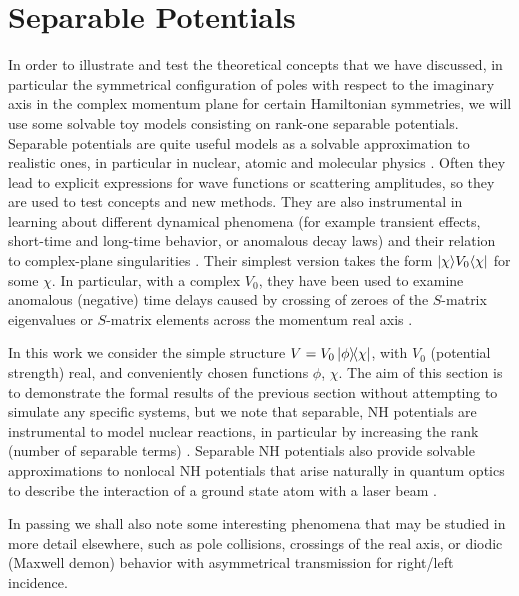 \section{Separable Potentials}
\label{sep_pot_sec}
%
%
In order to illustrate and test the theoretical concepts that we have discussed, in particular the
symmetrical configuration of poles with respect to the imaginary axis in the complex momentum plane for certain Hamiltonian symmetries, we will use some solvable toy models consisting on rank-one separable potentials.
Separable potentials are quite useful models as a solvable approximation to realistic ones, in particular in nuclear, atomic and molecular physics \cite{Popov2019}.
Often they lead to explicit expressions
for wave functions or scattering amplitudes, so they are used to test concepts and new methods.
They are also instrumental in learning about different dynamical phenomena (for example transient effects, short-time and long-time behavior, or anomalous decay laws)  and their relation to complex-plane singularities
\cite{Muga1990,Muga1996,Muga1996b,Muga1998a}. Their simplest version takes the form
$|\chi\rangle V_0\langle\chi|$ for some  $\chi$.   In particular, with a complex $V_0$,
they have been used to examine anomalous (negative) time delays caused by  crossing of zeroes of the $S$-matrix eigenvalues or $S$-matrix elements across the momentum real axis \cite{Muga1998b}.

In this work we consider the simple structure
$V=V_0 \ketbra{\phi}{\chi}$, with $V_0$ (potential strength) real, and conveniently chosen functions $\phi$, $\chi$.
The aim of this section is to demonstrate the formal results of the previous section without attempting to simulate any specific systems, but we note that separable, NH potentials are instrumental to model nuclear reactions, in particular  by increasing the rank (number of separable terms) \cite{Hlophe2017}.
Separable NH potentials also provide solvable approximations to nonlocal NH potentials that arise naturally in quantum optics to describe the interaction of a ground state atom with a laser beam \cite{Ruschhaupt2004a}.

In passing we shall also note some interesting phenomena that may be studied in more detail elsewhere, such as pole collisions, crossings of
the real axis, or diodic (Maxwell demon) behavior with asymmetrical transmission for right/left incidence.

